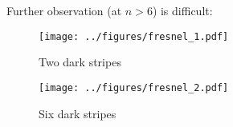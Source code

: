 \phantom{42}

Further observation (at $n>6$) is difficult:

\begin{figure}[h]
    \begin{minipage}{0.48\textwidth}
            \hspace{-0.5cm}
            \texttt{[image: ../figures/fresnel\_1.pdf]}
            \vspace{-1.5cm}
            \caption{Two dark stripes}
    \end{minipage}
    \hfill
    \begin{minipage}{0.48\textwidth}
        \hspace{-0.5cm}
        \texttt{[image: ../figures/fresnel\_2.pdf]}
        \vspace{-1.5cm}
        \caption{Six dark stripes}
    \end{minipage}
\end{figure}

